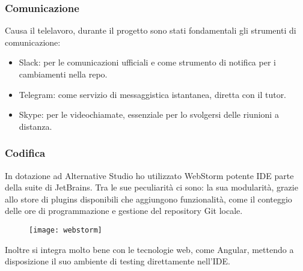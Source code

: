 \subsubsection{Comunicazione}
Causa il telelavoro, durante il progetto sono stati fondamentali gli strumenti di comunicazione:
\begin{itemize}
  \item Slack: per le comunicazioni ufficiali e come strumento di notifica per i cambiamenti nella repo.
  \item Telegram: come servizio di messaggistica istantanea, diretta con il tutor.
	\item Skype: per le videochiamate, essenziale per lo svolgersi delle riunioni a distanza.
\end{itemize}

\subsubsection{Codifica}
In dotazione ad Alternative Studio ho utilizzato WebStorm potente IDE parte della suite di JetBrains. Tra le sue peculiarità ci sono: la sua modularità, grazie allo store di plugins disponibili che aggiungono funzionalità, come il conteggio delle ore di programmazione e gestione del repository \gls{Git} locale.

\begin{figure}[htbp]
\begin{center}
\texttt{[image: webstorm]}
\end{center}
\end{figure}

Inoltre si integra molto bene con le tecnologie web, come Angular, mettendo a disposizione il suo ambiente di testing direttamente nell'IDE.

